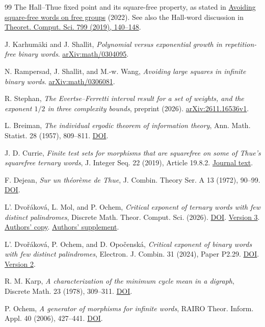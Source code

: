 \documentclass[11pt,reqno,a4paper]{amsart}
\theoremstyle{remark}
\begin{document}
\begin{thebibliography}{99}
The Hall--Thue fixed point and its square-free property, as stated in \href{https://doi.org/10.1016/j.tcs.2022.04.025}{Avoiding square-free words on free groups} (2022). See also the Hall-word discussion in \href{https://www.lirmm.fr/~ochem/morphisms/pairs.pdf}{Theoret. Comput. Sci. 799 (2019), 140--148}.

J. Karhum\"aki and J. Shallit, \emph{Polynomial versus exponential growth in repetition-free binary words}. \href{https://arxiv.org/abs/math/0304095}{arXiv:math/0304095}.

N. Rampersad, J. Shallit, and M.-w. Wang, \emph{Avoiding large squares in infinite binary words}. \href{https://arxiv.org/abs/math/0306081}{arXiv:math/0306081}.

R. Stephan,
\emph{The Evertse--Ferretti interval result for a set of weights, and the exponent $1/2$ in three complexity bounds},
preprint (2026).
\href{https://arxiv.org/abs/2611.16536v1}{arXiv:2611.16536v1}.

L. Breiman,
\emph{The individual ergodic theorem of information theory},
Ann. Math. Statist. 28 (1957), 809--811.
\href{https://doi.org/10.1214/aoms/1177706899}{DOI}.

J. D. Currie,
\emph{Finite test sets for morphisms that are squarefree on some of Thue's squarefree ternary words},
J. Integer Seq. 22 (2019), Article 19.8.2.
\href{https://cs.uwaterloo.ca/journals/JIS/VOL22/Currie/currie20.html}{Journal text}.

F. Dejean, \emph{Sur un th\'eor\`eme de Thue},
J. Combin. Theory Ser. A 13 (1972), 90--99.
\href{https://doi.org/10.1016/0097-3165(72)90011-8}{DOI}.

L'. Dvo\v r\'akov\'a, L. Mol, and P. Ochem,
\emph{Critical exponent of ternary words with few distinct palindromes},
Discrete Math. Theor. Comput. Sci. (2026).
\href{https://doi.org/10.46298/dmtcs.16125}{DOI}.
\href{https://arxiv.org/abs/2507.04925v3}{Version 3}.
\href{https://www.lirmm.fr/~ochem/morphisms/few_ternary_palindromes.pdf}{Authors' copy}.
\href{https://www.lirmm.fr/~ochem/morphisms/palin3.htm}{Authors' supplement}.

L'. Dvo\v r\'akov\'a, P. Ochem, and D. Opo\v censk\'a,
\emph{Critical exponent of binary words with few distinct palindromes},
Electron. J. Combin. 31 (2024), Paper P2.29.
\href{https://doi.org/10.37236/12574}{DOI}.
\href{https://arxiv.org/abs/2311.13003v2}{Version 2}.

R. M. Karp, \emph{A characterization of the minimum cycle mean in a digraph},
Discrete Math. 23 (1978), 309--311.
\href{https://doi.org/10.1016/0012-365X(78)90011-0}{DOI}.

P. Ochem, \emph{A generator of morphisms for infinite words},
RAIRO Theor. Inform. Appl. 40 (2006), 427--441.
\href{https://doi.org/10.1051/ita:2006020}{DOI}.


\end{thebibliography}
\end{document}
